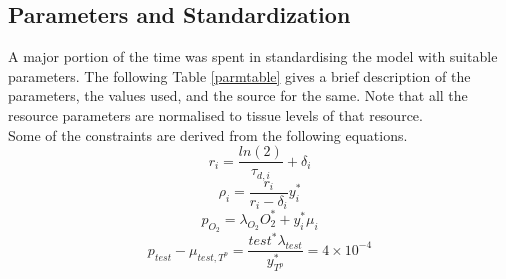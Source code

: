 \documentclass[11pt,a4paper]{article}
\begin{document}
\subsection{Parameters and Standardization}
A major portion of the time was spent in standardising the model with suitable parameters. The following Table \ref{parmtable} gives a brief description of the parameters, the values used, and the source for the same. Note that all the resource parameters are normalised to tissue levels of that resource.\\
Some of the constraints are derived from the following equations.
\begin{equation}
  r_i = \frac{ln(2)}{\tau_{d,i}} + \delta_i
  \label{r_eq}
\end{equation}
\begin{equation}
  \rho_i=\frac{r_i}{r_i-\delta_i} y_i^*
  \label{rho_eq}
\end{equation}
\begin{equation}
  p_{O_2} = \lambda_{O_2} O_2^* + y_i^* \mu_i
  \label{p_o2_eq}
\end{equation}
\begin{equation}
  p_{test} - \mu_{test,T^p} = \frac{test^* \lambda_{test}}{y_{T^p}^*} = 4 \times 10^{-4}
  \label{p_test_eq}
\end{equation}
\end{document}
